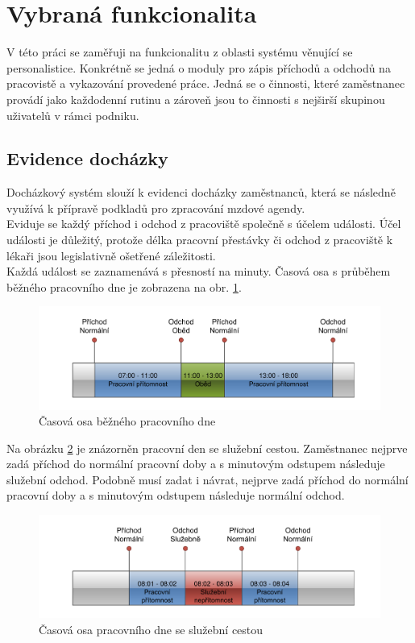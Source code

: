 \documentclass{diplomka}
\begin{document}
\section{Vybraná funkcionalita}
V této práci se zaměřuji na funkcionalitu z oblasti systému věnující se personalistice. Konkrétně se jedná o moduly pro zápis příchodů a odchodů na pracovistě a vykazování provedené práce. Jedná se o činnosti, které zaměstnanec provádí jako každodenní rutinu a zároveň jsou to činnosti s nejširší skupinou uživatelů v rámci podniku.
 
\subsection{Evidence docházky}
Docházkový systém slouží k evidenci docházky zaměstnanců, která se následně využívá k přípravě podkladů pro zpracování mzdové agendy.\\ \indent
Eviduje se každý příchod i odchod z pracoviště společně s účelem události. Účel události je důležitý, protože délka pracovní přestávky či odchod z pracoviště k lékaři jsou legislativně ošetřené záležitosti.\\ \indent Každá událost se zaznamenává s přesností na minuty. Časová osa s průběhem běžného pracovního dne je zobrazena na obr. \ref{fig:attn}.
\begin{figure}[H]
  \centering
  \includegraphics[scale=0.7]{visio/attnormal.pdf}
\caption{Časová osa běžného pracovního dne}
\label{fig:attn}
\end{figure}

Na obrázku \ref{fig:atts} je znázorněn pracovní den se služební cestou. Zaměstnanec nejprve zadá příchod do normální pracovní doby a s minutovým odstupem následuje služební odchod. Podobně musí zadat i návrat, nejprve zadá příchod do normální pracovní doby a s minutovým odstupem následuje normální odchod.
\begin{figure}[H]
  \centering
  \includegraphics[scale=0.7]{visio/attservice.pdf}
\caption{Časová osa pracovního dne se služební cestou}
\label{fig:atts}
\end{figure}
\end{document}
